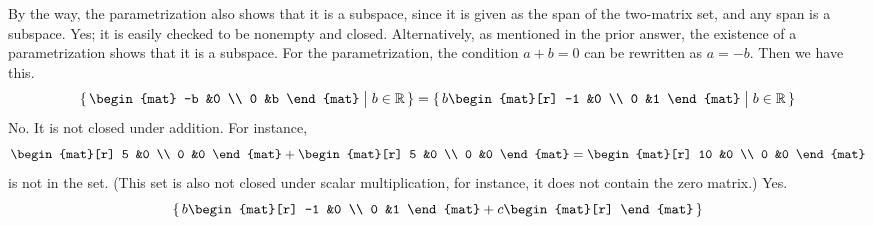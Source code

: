 \begin{exercises}
\begin{answer}
\begin{exparts}
          By the way, the parametrization also shows that it is a subspace,
          since it is given as the span of the two-matrix set,
          and any span is a subspace.
        \partsitem Yes; it is easily checked to be nonempty and closed.
         Alternatively, as mentioned in the prior answer, the existence
         of a parametrization shows that it is a subspace.
         For the parametrization, 
         the condition $a+b=0$ can be rewritten as $a=-b$.
         Then we have this.
          \begin{equation*}
            \set{\begin{mat}
                    -b  &0  \\
                    0   &b
                  \end{mat}
                 \suchthat b\in\Re}
            =\set{b\begin{mat}[r]
                    -1  &0  \\
                    0   &1
                  \end{mat}
                 \suchthat b\in\Re}
          \end{equation*}
        \partsitem No.
          It is not closed under addition.
          For instance, 
          \begin{equation*}
            \begin{mat}[r]
              5  &0  \\
              0  &0
            \end{mat}
            +\begin{mat}[r]
              5  &0  \\
              0  &0
            \end{mat}
            =\begin{mat}[r]
              10  &0  \\
              0  &0
            \end{mat}
          \end{equation*}
          is not in the set.
          (This set is also not closed under scalar multiplication,
          for instance, it does not contain the zero matrix.)
        \partsitem Yes.
          \begin{equation*}
            \set{b\begin{mat}[r]
                    -1  &0  \\
                    0   &1
                  \end{mat}
                 +c\begin{mat}[r]

\end{mat}}
\end{equation*}
\end{exparts}
\end{answer}
\end{exercises}
